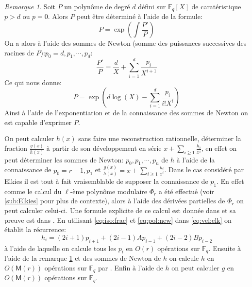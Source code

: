 \documentclass[10pt,a4paper]{book}
\theoremstyle{plain}
\theoremstyle{definition}
\theoremstyle{definition}
\theoremstyle{definition}
\theoremstyle{definition}
\theoremstyle{remark}
\newtheorem{rem}[thm]{Remarque}
\theoremstyle{remark}
\theoremstyle{definition}
\begin{document}
\begin{rem}
\label{rem:pol:rec}
Soit $P$ un polynôme de degré $d$ défini sur $\mathbb{F}_q[X]$ de caratéristique $p>d$ ou $p=0$. Alors $P$ peut être déterminé à l'aide de la formule:
\begin{equation}
P=\exp\left(\int{\frac{P'}{P}}\right)
\end{equation} 
On a alors à l'aide des sommes de Newton (somme des puissances successives des racines de $P$):$p_0=d,p_1, \cdots, p_d$:
\begin{equation}
\label{eq:pol:new}
\frac{P'}{P}= \frac{d}{X} + \sum_{i = 1}^d \frac{p_i}{X^{i+1}}
\end{equation}
Ce qui nous donne:
\begin{equation}
P=\exp\left( d \log(X) - \sum_{i = 1}^{d} \frac{p_i}{i!X^i} \right)
\end{equation} 
Ainsi à l'aide de l'exponentiation et de la connaissance des sommes de Newton on est capable d'exprimer $P$.

On peut calculer $h(x)$ sans faire une reconstruction rationnelle, déterminer 
la fraction $\frac{g(x)}{h(x)}$ à partir de son développement en série 
$x+\sum_{i \geqslant 1}\frac{h_i}{x^i}$, en effet on peut déterminer les sommes
de Newton: $p_0,p_1,\cdots, p_n$ de $h$ à l'aide de la connaissance de 
$p_0=r-1, p_1$ et $\frac{g(x)}{h(x)}=x+\sum_{i \geqslant 1}\frac{h_i}{x^i}$.
Dans le cas considéré par Elkies il est tout à fait vraisemblable de supposer 
la connaissance de $p_1$. En effet comme le calcul du $\ell$-ème polynôme 
modulaire $\Phi_{r}$ a été effectué (voir \ref{sub:Elkies} pour plus de 
contexte), alors à l'aide des dérivées partielles de $\Phi_{r}$ on peut 
calculer celui-ci. Une formule explicite de ce calcul est donnée dans 
\cite[Theorem 17.22]{ehcc05} et sa preuve est dans \cite[§7]{Schoof95}. En 
utilisant \eqref{eq:iso:frac} et \eqref{eq:pol:new} dans \eqref{eq:vel:elk} on 
établit la récurrence:
\begin{equation}
\label{eq:p:rec}
h_i=(2i+1)p_{i+1}+(2i-1)Ap_{i-1}+(2i-2)Bp_{i-2}
\end{equation}
à l'aide de laquelle on calcule tous les $p_i$ en $O(r)$ opérations sur 
$\mathbb{F}_q$. Ensuite à l'aide de la remarque \ref{rem:pol:rec} et des sommes
de Newton de $h$ on calcule $h$ en $O(\mathsf{M}(r))$ opérations sur 
$\mathbb{F}_q$ par \cite[§2.2]{BMSS08}.
Enfin à l'aide de $h$ on peut calculer $g$ en $O(\mathsf{M}(r))$ opérations sur
$\mathbb{F}_q$.
\end{rem}
 
\end{document}
